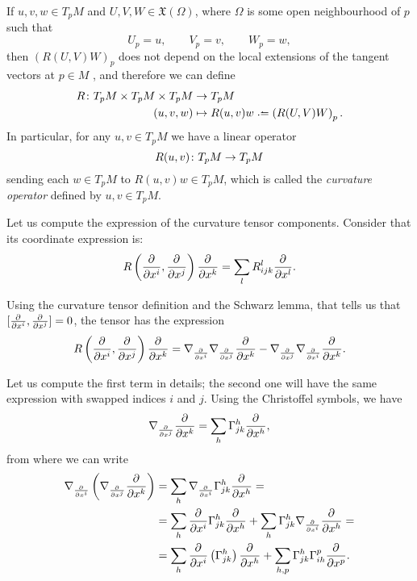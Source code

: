\begin{remark}	
	If $u,v,w \in T_pM$ and $U,V,W \in \mathfrak{X}(\Omega)$, where $\Omega$ is some open neighbourhood of $p$ such that
	\[
		U_p = u, \qquad V_p = v, \qquad W_p = w,
	\]
	then $\left( R(U,V)W \right) _p$ does not depend on the local extensions of the tangent vectors at $p\in M$ \cite[p. 38]{oneill83}, and therefore we can define
	\begin{align*}
		R \colon T_p M \times T_p M  \times T_p M  &\to T_p M \\
		(u,v,w) &\mapsto R(u,v)w \defeq \left(R(U,V)W\right)_p.
	\end{align*}
	In particular, for any $u,v \in T_p M$ we have a linear operator
	\[
	R(u,v) \colon T_p M  \to T_p M \\
	\]
	sending each $w\in T_pM$ to $R(u,v)w \in T_p M$, which is called the \emph{curvature operator} defined by $u,v\in T_p M$.
\end{remark}

Let us compute the expression of the curvature tensor components. Consider that its coordinate expression is:
\begin{equation}
\label{eq:curvaturecomponents}
R\left( \frac{\partial^{} }{\partial x^i}, \frac{\partial^{} }{\partial x^j} \right)\frac{\partial^{} }{\partial x^k} = \sum_l R^l_{ijk} \frac{\partial^{} }{\partial x^l}.
\end{equation}

Using the curvature tensor definition and the Schwarz lemma, that tells us that $[\frac{\partial^{} }{\partial x^i}, \frac{\partial^{} }{\partial x^j}] = 0$, the tensor has the expression
\[
R\left( \frac{\partial^{} }{\partial x^i}, \frac{\partial^{} }{\partial x^j} \right)\frac{\partial^{} }{\partial x^k} = \nabla_{\frac{\partial^{} }{\partial x^i}} \nabla_{\frac{\partial^{} }{\partial x^j}} \frac{\partial^{} }{\partial x^k} - \nabla_{\frac{\partial^{} }{\partial x^j}} \nabla_{\frac{\partial^{} }{\partial x^i}} \frac{\partial^{} }{\partial x^k}.
\]

Let us compute the first term in details; the second one will have the same expression with swapped indices $i$ and $j$. Using the Christoffel symbols, we have
\[
\nabla_{\frac{\partial^{} }{\partial x^j}} \frac{\partial^{} }{\partial x^k} = \sum_h \Gamma^h_{jk} \frac{\partial^{} }{\partial x^h},
\]
from where we can write
\begin{align*}
\nabla_{\frac{\partial^{} }{\partial x^i}} \left( \nabla_{\frac{\partial^{} }{\partial x^j}} \frac{\partial^{} }{\partial x^k} \right) &= \sum_h \nabla_{\frac{\partial^{} }{\partial x^i}} \Gamma^h_{jk} \frac{\partial^{} }{\partial x^h} = \\
&= \sum_h \frac{\partial^{} }{\partial x^i} \Gamma^h_{jk} \frac{\partial^{} }{\partial x^h} + \sum_h \Gamma^h_{jk} \nabla_{\frac{\partial^{} }{\partial x^i}} \frac{\partial^{} }{\partial x^h} =\\
&= \sum_h \frac{\partial^{} }{\partial x^i} \left( \Gamma^h_{jk} \right) \frac{\partial^{} }{\partial x^h} + \sum_{h,p} \Gamma^h_{jk} \Gamma^p_{ih} \frac{\partial^{} }{\partial x^p}.
\end{align*}

